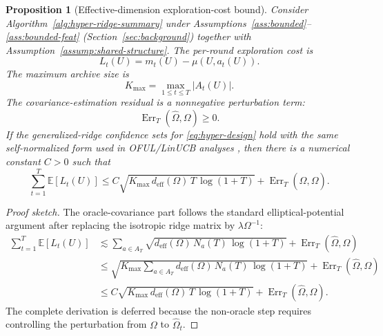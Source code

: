 \documentclass{article} %
\newtheorem{proposition}[theorem]{Proposition}
\begin{document}
\begin{proposition}[Effective-dimension exploration-cost bound]
\label{prop:deff-bound}
Consider Algorithm~\ref{alg:hyper-ridge-summary} under Assumptions~\ref{ass:bounded}--\ref{ass:bounded-feat} (Section~\ref{sec:background}) together with Assumption~\ref{assump:shared-structure}. The per-round exploration cost is
\begin{equation}
\label{eq:hyper-lt}
L_t(U)
=
m_t(U)-\mu(U,a_t(U)).
\end{equation}
The maximum archive size is
\begin{equation}
\label{eq:hyper-kmax}
K_{\max}
=
\max_{1\le t\le T}|A_t(U)|.
\end{equation}
The covariance-estimation residual is a nonnegative perturbation term:
\begin{equation}
\label{eq:hyper-err}
\operatorname{Err}_{T}(\widehat{\Omega},\Omega)
\ge
0.
\end{equation}
If the generalized-ridge confidence sets for \eqref{eq:hyper-design} hold with the same self-normalized form used in OFUL/LinUCB analyses \citep{abbasi2011oful,chu2011linucb}, then there is a numerical constant \(C>0\) such that
\begin{equation}
\label{eq:hyper-deff-bound}
\sum_{t=1}^{T}
\mathbb{E}[L_t(U)]
\le
C
\sqrt{
K_{\max}\,
d_{\mathrm{eff}}(\Omega)\,
T\,
\log(1+T)
}
+
\operatorname{Err}_{T}(\widehat{\Omega},\Omega).
\end{equation}
\end{proposition}

\begin{proof}[Proof sketch]
The oracle-covariance part follows the standard elliptical-potential argument after replacing the isotropic ridge matrix by \(\lambda\Omega^{-1}\):
\begin{align}
\sum_{t=1}^{T}\mathbb{E}[L_t(U)]
&\lesssim
\sum_{a\in A_T}
\sqrt{
d_{\mathrm{eff}}(\Omega)\,
N_a(T)\,
\log(1+T)
}
+
\operatorname{Err}_{T}(\widehat{\Omega},\Omega)
\nonumber\\
&\le
\sqrt{
K_{\max}
\sum_{a\in A_T}
d_{\mathrm{eff}}(\Omega)\,
N_a(T)\,
\log(1+T)
}
+
\operatorname{Err}_{T}(\widehat{\Omega},\Omega)
\nonumber\\
&\le
C
\sqrt{
K_{\max}\,
d_{\mathrm{eff}}(\Omega)\,
T\,
\log(1+T)
}
+
\operatorname{Err}_{T}(\widehat{\Omega},\Omega).
\label{eq:hyper-proof-sketch}
\end{align}
The complete derivation is deferred because the non-oracle step requires controlling the perturbation from \(\Omega\) to \(\widehat{\Omega}_t\).
\end{proof}
\end{document}
